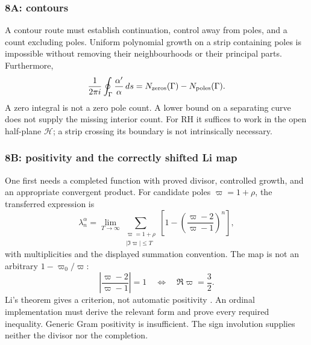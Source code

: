 \documentclass[11pt]{amsart}
\numberwithin{equation}{section}
\theoremstyle{plain}
\theoremstyle{definition}
\theoremstyle{remark}
\begin{document}
\subsubsection{8A: contours}
\label{subsubsec:a12-contours}
A contour route must establish continuation, control away from poles,
and a count excluding poles. Uniform polynomial growth on a strip
containing poles is impossible without removing their neighbourhoods
or their principal parts. Furthermore,
\begin{equation}
\label{eq:a12-argument-principle}
\frac1{2\pi i}\oint_\Gamma\frac{\alpha'}{\alpha}\,ds
=N_{\rm zeros}(\Gamma)-N_{\rm poles}(\Gamma).
\end{equation}
A zero integral is not a zero pole count. A lower bound on a separating
curve does not supply the missing interior count.
For RH it suffices to work in the open half-plane $\mathcal H$;
a strip crossing its boundary is not intrinsically necessary.

\subsubsection{8B: positivity and the correctly shifted Li map}
\label{subsubsec:a12-Li}
One first needs a completed function with proved divisor, controlled
growth, and an appropriate convergent product.
For candidate poles $\varpi=1+\rho$, the transferred expression is
\begin{equation}
\label{eq:a12-Li}
\lambda_n^\alpha=
\lim_{T\to\infty}\sum_{\substack{\varpi=1+\rho\\|\Im\varpi|\le T}}
\left[1-\left(\frac{\varpi-2}{\varpi-1}\right)^n\right],
\end{equation}
with multiplicities and the displayed summation convention.
The map is not an arbitrary $1-\varpi_0/\varpi$:
\begin{equation}
\label{eq:a12-Li-circle}
\left|\frac{\varpi-2}{\varpi-1}\right|=1
\quad\Longleftrightarrow\quad\Re\varpi=\frac32.
\end{equation}
Li's theorem gives a criterion, not automatic positivity \cite{Li1997}.
An ordinal implementation must derive the relevant form and prove every
required inequality. Generic Gram positivity is insufficient.
The sign involution supplies neither the divisor nor the completion.
\end{document}
